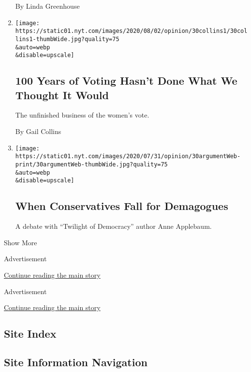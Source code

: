 \begin{enumerate}
  By Linda Greenhouse
\item
  \href{/2020/07/30/opinion/sunday/19th-amendment-women-suffrage.html}{}

  \texttt{[image: https://static01.nyt.com/images/2020/08/02/opinion/30collins1/30collins1-thumbWide.jpg?quality=75\\\&auto=webp\\\&disable=upscale]}

  \hypertarget{100-years-of-voting-hasnt-done-what-we-thought-it-would}{%
  \subsection{100 Years of Voting Hasn't Done What We Thought It
  Would}\label{100-years-of-voting-hasnt-done-what-we-thought-it-would}}

  The unfinished business of the women's vote.

  By Gail Collins
\item
  \href{/2020/07/30/opinion/the-argument-authoritarianism-anne-applebaum.html}{}

  \texttt{[image: https://static01.nyt.com/images/2020/07/31/opinion/30argumentWeb-print/30argumentWeb-thumbWide.jpg?quality=75\\\&auto=webp\\\&disable=upscale]}

  \hypertarget{when-conservatives-fall-for-demagogues}{%
  \subsection{When Conservatives Fall for
  Demagogues}\label{when-conservatives-fall-for-demagogues}}

  A debate with ``Twilight of Democracy'' author Anne Applebaum.
\end{enumerate}

Show More

Advertisement

\protect\hyperlink{after-mid2}{Continue reading the main story}

Advertisement

\protect\hyperlink{after-mktg}{Continue reading the main story}

\hypertarget{site-index}{%
\subsection{Site Index}\label{site-index}}

\hypertarget{site-information-navigation}{%
\subsection{Site Information
Navigation}\label{site-information-navigation}}

